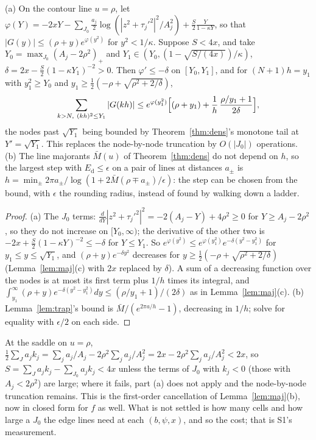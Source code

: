 \begin{corollary}\label{cor:tail}
(a) On the contour line $u=\rho$, let $\varphi(Y)=-2xY-\sum_{J_0}\frac{a_j}2\log(|z^2+\tau_j'^2|^2/A_j^2)+\frac S2
\frac Y{1-\kappa Y}$, so that $|G(y)|\le(\rho+y)e^{\varphi(y^2)}$ for $y^2<1/\kappa$. Suppose $S<4x$, and take
$Y_0=\max_{J_0}(A_j-2\rho^2)_+$ and $Y_1\in(Y_0,(1-\sqrt{S/(4x)})/\kappa)$, $\delta=2x-\frac S2(1-\kappa Y_1)^{-2}>0$.
Then $\varphi'\le-\delta$ on $[Y_0,Y_1]$, and for $(N+1)h=y_1$ with $y_1^2\ge Y_0$ and $y_1\ge\frac12(-\rho+
\sqrt{\rho^2+2/\delta})$,
\[
\sum_{k>N,\ (kh)^2\le Y_1}|G(kh)|\le e^{\varphi(y_1^2)}\Bigl[(\rho+y_1)+\frac1h\,\frac{\rho/y_1+1}{2\delta}\Bigr],
\]
the nodes past $\sqrt{Y_1}$ being bounded by Theorem~\ref{thm:dens}'s monotone tail at $Y'=\sqrt{Y_1}$. This replaces
the node-by-node truncation by $O(|J_0|)$ operations. (b) The line majorants $\bar M(u)$ of Theorem~\ref{thm:dens} do
not depend on $h$, so the largest step with $E_{\mathrm d}\le\epsilon$ on a pair of lines at distances $a_\pm$ is
$h=\min_\pm2\pi a_\pm/\log(1+2\bar M(\rho\mp a_\pm)/\epsilon)$: the step can be chosen from the bound, with
$\epsilon$ the rounding radius, instead of found by walking down a ladder.
\end{corollary}
\begin{proof}
(a) The $J_0$ terms: $\frac d{dY}|z^2+\tau_j'^2|^2=-2(A_j-Y)+4\rho^2\ge0$ for $Y\ge A_j-2\rho^2$, so they do not
increase on $[Y_0,\infty)$; the derivative of the other two is $-2x+\frac S2(1-\kappa Y)^{-2}\le-\delta$ for $Y\le
Y_1$. So $e^{\varphi(y^2)}\le e^{\varphi(y_1^2)}e^{-\delta(y^2-y_1^2)}$ for $y_1\le y\le\sqrt{Y_1}$, and $(\rho+y)
e^{-\delta y^2}$ decreases for $y\ge\frac12(-\rho+\sqrt{\rho^2+2/\delta})$ (Lemma~\ref{lem:maj}(c) with $2x$ replaced
by $\delta$). A sum of a decreasing function over the nodes is at most its first term plus $1/h$ times its integral,
and $\int_{y_1}^\infty(\rho+y)e^{-\delta(y^2-y_1^2)}dy\le(\rho/y_1+1)/(2\delta)$ as in Lemma~\ref{lem:maj}(c). (b)
Lemma~\ref{lem:trap}'s bound is $\bar M/(e^{2\pi a/h}-1)$, decreasing in $1/h$; solve for equality with $\epsilon/2$
on each side.
\end{proof}

At the saddle on $u=\rho$, $\frac12\sum_Ja_jk_j=\sum_ja_j/A_j-2\rho^2\sum_ja_j/A_j^2=2x-2\rho^2\sum_ja_j/A_j^2<2x$, so
$S=\sum_Ja_jk_j-\sum_{J_0}a_jk_j<4x$ unless the terms of $J_0$ with $k_j<0$ (those with $A_j<2\rho^2$) are large;
where it fails, part (a) does not apply and the node-by-node truncation remains. This is the first-order
cancellation of Lemma~\ref{lem:maj}(b), now in closed form for $f$ as well. What is not settled is how many cells and how large a
$J_0$ the edge lines need at each $(b,\psi,x)$, and so the cost; that is S1's measurement.

